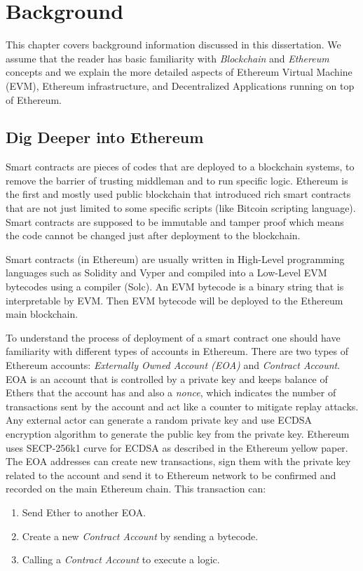 \chapter{Background}
\label{chap:background}
This chapter covers background information discussed in this dissertation. We assume that the reader has basic familiarity with \textit{Blockchain} and \textit{Ethereum} concepts and we explain the more detailed aspects of Ethereum Virtual Machine (EVM), Ethereum infrastructure, and Decentralized Applications running on top of Ethereum. 


\section{Dig Deeper into Ethereum}
Smart contracts are pieces of codes that are deployed to a blockchain systems, to remove the barrier of trusting middleman and to run specific logic. Ethereum is the first and mostly used public blockchain that introduced rich smart contracts that are not just limited to some specific scripts (like Bitcoin scripting language). Smart contracts are supposed to be immutable and tamper proof which means the code cannot be changed just after deployment to the blockchain.

Smart contracts (in Ethereum) are usually written in High-Level programming languages such as Solidity and Vyper and compiled into a Low-Level EVM bytecodes using a compiler (\eg Solc). An EVM bytecode is a binary string that is interpretable by EVM. Then EVM bytecode will be deployed to the Ethereum main blockchain.

To understand the process of deployment of a smart contract one should have familiarity with different types of accounts in Ethereum. There are two types of Ethereum accounts: \textit{Externally Owned Account (EOA)} and \textit{Contract Account}. 
EOA is an account that is controlled by a private key and keeps balance of Ethers that the account has and also a \textit{nonce}, which indicates the number of transactions sent by the account and act like a counter to mitigate replay attacks. Any external actor can generate a random private key and use ECDSA encryption algorithm to generate the public key from the private key. Ethereum uses SECP-256k1 curve for ECDSA as described in the Ethereum yellow paper.
The EOA addresses can create new transactions, sign them with the private key related to the account and send it to Ethereum network to be confirmed and recorded on the main Ethereum chain. This transaction can:
\begin{enumerate}
    \item Send Ether to another EOA.
    \item Create a new \textit{Contract Account} by sending a bytecode.
    \item Calling a \textit{Contract Account} to execute a logic.
\end{enumerate}

